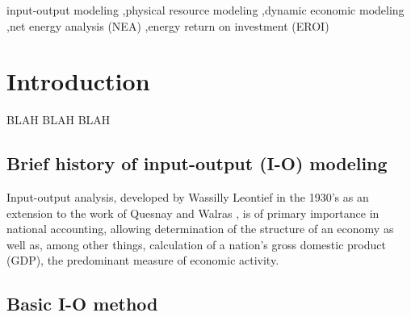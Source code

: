 \documentclass[authoryear,preprint,review,12pt]{elsarticle}
\begin{document}
\begin{frontmatter}
\begin{abstract}
\end{abstract}

\begin{keyword}

input-output modeling \sep physical resource modeling \sep dynamic economic modeling \sep net energy analysis (NEA) \sep energy return on investment (EROI)



\end{keyword}

\end{frontmatter}

\linenumbers



\section{Introduction}

BLAH BLAH BLAH

\subsection{Brief history of input-output (I-O) modeling}

Input-output analysis, developed by Wassilly Leontief in the 1930's as an extension to the work of Quesnay and Walras \cite{Leontief1936}, is of primary importance in national accounting, allowing determination of the structure of an economy as well as, among other things, calculation of a nation's gross domestic product (GDP), the predominant measure of economic activity.

\subsection{Basic I-O method}
\end{document}
